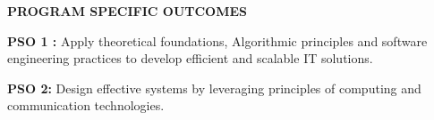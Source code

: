\begin{center}
\begin{minipage}{0.92\textwidth}
\small

\vspace{0.25cm}


\begin{center}
{\large\bfseries\textcolor{cyan!70!blue}{PROGRAM SPECIFIC  OUTCOMES}}
\end{center}

\textbf{PSO 1 :}
Apply theoretical foundations, Algorithmic principles and software engineering practices to develop efficient and scalable IT solutions.

\vspace{0.12cm}

\textbf{PSO 2:}
Design effective systems by leveraging principles of computing and communication technologies.


\vspace{0.25cm}


\end{minipage}
\end{center}
